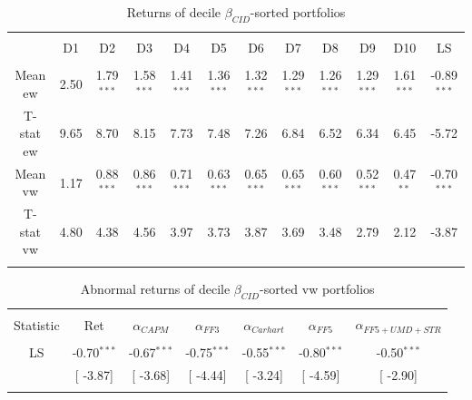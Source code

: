 \documentclass[12pt]{article}
\begin{document}
\begin{table}[!htbp] \centering 
  \caption{Returns of decile $\beta_{CID}$-sorted portfolios} 
  \label{} 
\begin{tabular}{@{\extracolsep{-5pt}} cccccccccccc} 
\\[-1.8ex]\hline 
\hline \\[-1.8ex] 
 & D1 & D2 & D3 & D4 & D5 & D6 & D7 & D8 & D9 & D10 & LS \\ 
\hline \\[-1.8ex] 
Mean ew & 2.50 & 1.79$^{***}$ & 1.58$^{***}$ & 1.41$^{***}$ & 1.36$^{***}$ & 1.32$^{***}$ & 1.29$^{***}$ & 1.26$^{***}$ & 1.29$^{***}$ & 1.61$^{***}$ & -0.89$^{***}$ \\ 
T-stat ew & 9.65 & 8.70 & 8.15 & 7.73 & 7.48 & 7.26 & 6.84 & 6.52 & 6.34 & 6.45 & -5.72 \\ 
Mean vw & 1.17 & 0.88$^{***}$ & 0.86$^{***}$ & 0.71$^{***}$ & 0.63$^{***}$ & 0.65$^{***}$ & 0.65$^{***}$ & 0.60$^{***}$ & 0.52$^{***}$ & 0.47$^{**}$ & -0.70$^{***}$ \\ 
T-stat vw & 4.80 & 4.38 & 4.56 & 3.97 & 3.73 & 3.87 & 3.69 & 3.48 & 2.79 & 2.12 & -3.87 \\ 
\hline \\[-1.8ex] 
\end{tabular} 
\end{table}



\begin{table}[!htbp] \centering 
  \caption{Abnormal returns of decile $\beta_{CID}$-sorted vw portfolios} 
  \label{} 
\begin{tabular}{@{\extracolsep{0pt}} ccccccc} 
\\[-1.8ex]\hline 
\hline \\[-1.8ex] 
Statistic & Ret & $\alpha_{CAPM}$ & $\alpha_{FF3}$ & $\alpha_{Carhart}$ & $\alpha_{FF5}$ & $\alpha_{FF5+UMD+STR}$ \\ 
\hline \\[-1.8ex] 
LS & -0.70$^{***}$ & -0.67$^{***}$ & -0.75$^{***}$ & -0.55$^{***}$ & -0.80$^{***}$ & -0.50$^{***}$ \\ 
 & [ -3.87] & [ -3.68] & [ -4.44] & [ -3.24] & [ -4.59] & [ -2.90] \\ 
\hline \\[-1.8ex] 
\end{tabular} 
\end{table}
\end{document}
